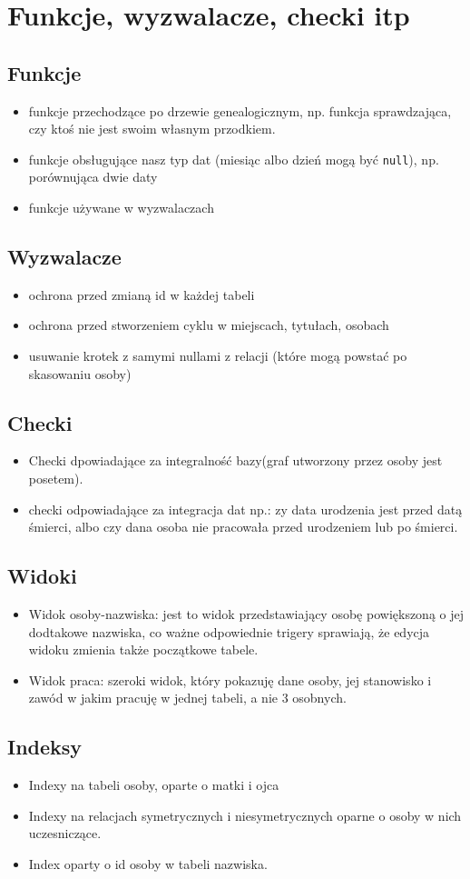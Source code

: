 \documentclass{article}
\begin{document}
\section{Funkcje, wyzwalacze, checki itp}

\subsection{Funkcje}
\begin{itemize}
\item funkcje przechodzące po drzewie genealogicznym, np. funkcja sprawdzająca, czy ktoś nie jest swoim własnym przodkiem.
\item funkcje obsługujące nasz typ dat (miesiąc albo dzień mogą być \texttt{null}), np. porównująca dwie daty
\item funkcje używane w wyzwalaczach
\end{itemize}

\subsection{Wyzwalacze}
\begin{itemize}
\item ochrona przed zmianą id w każdej tabeli
\item ochrona przed stworzeniem cyklu w miejscach, tytułach, osobach
\item usuwanie krotek z samymi nullami z relacji (które mogą powstać po skasowaniu osoby)
\end{itemize}

\subsection{Checki}

\begin{itemize}
\item Checki dpowiadające za integralność bazy(graf utworzony przez osoby jest posetem).
\item checki odpowiadające za integracja dat np.: zy data urodzenia jest przed datą śmierci, albo czy dana osoba nie pracowała przed urodzeniem lub po śmierci.
\end{itemize}
\subsection{Widoki}
\begin{itemize}
\item Widok osoby-nazwiska: jest to widok przedstawiający osobę powiększoną o jej dodtakowe nazwiska, co ważne odpowiednie trigery sprawiają, że edycja widoku zmienia także początkowe tabele.
\item Widok praca: szeroki widok, który pokazuję dane osoby, jej stanowisko i zawód w jakim pracuję w jednej tabeli, a nie 3 osobnych.
\end{itemize}
\subsection{Indeksy}
\begin{itemize}
\item Indexy na tabeli osoby, oparte o matki i ojca 
\item Indexy na relacjach symetrycznych i niesymetrycznych oparne o osoby w nich uczesniczące.
\item Index oparty o id osoby w tabeli nazwiska.
\end{itemize}
\end{document}
